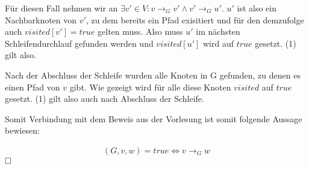\documentclass[12pt]{scrartcl}%
\theoremstyle{nonumberplain}
\begin{document}
Für diesen Fall nehmen wir an $\exists v' \in V: v \rightarrow_G v' \wedge v' \rightarrow_G u'$. $u'$ ist also ein Nachbarknoten von $v'$, zu dem bereits ein Pfad exisitiert und für den demzufolge auch $visited[v'] = true$ gelten muss. Also muss $u'$ im nächsten Schleifendurchlauf gefunden werden und $visited[u']$ wird auf $true$ gesetzt. (1) gilt also.

Nach der Abschluss der Schleife wurden alle Knoten in G gefunden, zu denen es einen Pfad von $v$ gibt. Wie gezeigt wird für alle diese Knoten $visited$ auf $true$ gesetzt. (1) gilt also auch nach Abschluss der Schleife. 

Somit Verbindung mit dem Beweis aus der Vorlesung ist somit folgende Aussage bewiesen:

\begin{align*}
	(G,v,w) = true \Leftrightarrow v \rightarrow_G w
\end{align*}
$	\hfill\square$
\end{document}
